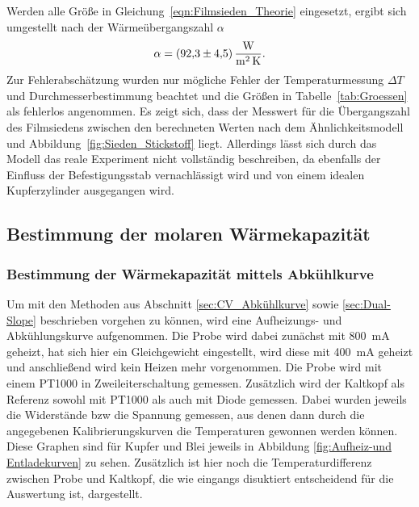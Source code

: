 \documentclass[parskip=half, a4paper,twoside,final]{article}
\begin{document}
Werden alle Größe in Gleichung~\eqref{eqn:Filmsieden_Theorie} eingesetzt, ergibt sich umgestellt nach der Wärmeübergangszahl $\alpha$
\begin{align}
  \alpha = \SI{92.3\pm 4.5}{\watt\per\metre\squared\per\kelvin}.
\end{align}
Zur Fehlerabschätzung wurden nur mögliche Fehler der Temperaturmessung $\Delta T$ und Durchmesserbestimmung beachtet und die Größen in Tabelle~\ref{tab:Groessen} als fehlerlos angenommen. Es zeigt sich, dass der Messwert für die Übergangszahl des Filmsiedens zwischen den berechneten Werten nach dem Ähnlichkeitsmodell und Abbildung~\ref{fig:Sieden_Stickstoff} liegt. Allerdings lässt sich durch das Modell das reale Experiment nicht vollständig beschreiben, da ebenfalls der Einfluss der Befestigungsstab vernachlässigt wird und von einem idealen Kupferzylinder ausgegangen wird.

\subsection{Bestimmung der molaren Wärmekapazität}
\subsubsection{Bestimmung der Wärmekapazität mittels Abkühlkurve}
Um mit den Methoden aus Abschnitt \ref{sec:CV_Abkühlkurve} sowie \ref{sec:Dual-Slope} beschrieben vorgehen zu können, wird eine Aufheizungs- und Abkühlungskurve aufgenommen. Die Probe wird dabei zunächst mit \SI{800}{\milli\ampere} geheizt, hat sich hier ein Gleichgewicht eingestellt, wird diese mit \SI{400}{\milli\ampere} geheizt und anschließend wird kein Heizen mehr vorgenommen. Die Probe wird mit einem PT1000 in Zweileiterschaltung gemessen. Zusätzlich wird der Kaltkopf als Referenz sowohl mit PT1000 als auch mit Diode gemessen. Dabei wurden jeweils die Widerstände bzw die Spannung gemessen, aus denen dann durch die angegebenen Kalibrierungskurven die Temperaturen gewonnen werden können. Diese Graphen sind für Kupfer und Blei jeweils in Abbildung \ref{fig:Aufheiz-und Entladekurven} zu sehen. Zusätzlich ist hier noch die Temperaturdifferenz zwischen Probe und Kaltkopf, die wie eingangs disuktiert entscheidend für die Auswertung ist, dargestellt.
\end{document}
